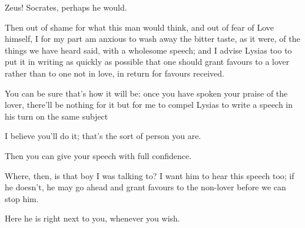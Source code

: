 Zeus! Socrates, perhaps he would.

Then out of shame for what this man would think, and out of
fear of Love himself, I for my part am anxious to wash away the bitter
taste, as it were, of the things we have heard said, with a wholesome
speech; and I advise Lysias too  to put it in writing as quickly
as possible that one should grant favours to a lover rather than to one
not in love, in return for favours
received.

You can be sure that's how it will be: once you have spoken
your praise of the lover, there'll be nothing for it but for me to
compel Lysias to write a speech in his turn on the  same subject

I believe you'll do it; that's the sort of person you are.

Then you can give your speech with full confidence.

Where, then, is that boy I was talking to? I want him to hear
this speech too; if he doesn't, he may go ahead and  grant
favours to the non-lover before we can stop him.

Here he is right next to you, whenever you
wish.

